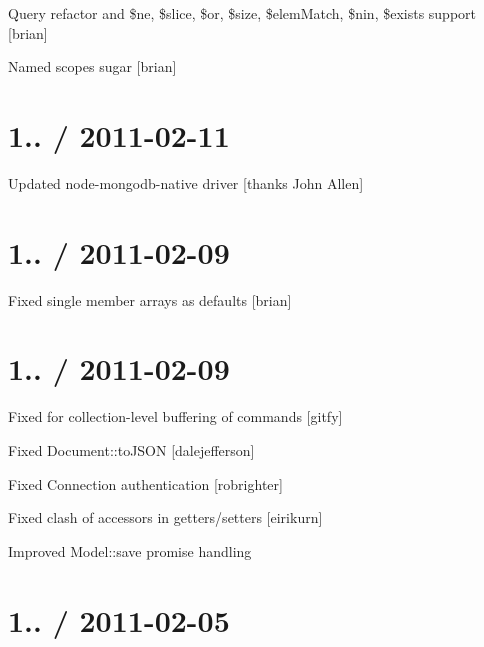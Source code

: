 \begin{DoxyItemize}
\item Query refactor and \$ne, \$slice, \$or, \$size, \$elem\+Match, \$nin, \$exists support \mbox{[}brian\mbox{]}
\item Named scopes sugar \mbox{[}brian\mbox{]}
\end{DoxyItemize}

\section*{1.. / 2011-\/02-\/11 }


\begin{DoxyItemize}
\item Updated node-\/mongodb-\/native driver \mbox{[}thanks John Allen\mbox{]}
\end{DoxyItemize}

\section*{1.. / 2011-\/02-\/09 }


\begin{DoxyItemize}
\item Fixed single member arrays as defaults \mbox{[}brian\mbox{]}
\end{DoxyItemize}

\section*{1.. / 2011-\/02-\/09 }


\begin{DoxyItemize}
\item Fixed for collection-\/level buffering of commands \mbox{[}gitfy\mbox{]}
\item Fixed {\ttfamily Document\+::to\+J\+S\+ON} \mbox{[}dalejefferson\mbox{]}
\item Fixed {\ttfamily Connection} authentication \mbox{[}robrighter\mbox{]}
\item Fixed clash of accessors in getters/setters \mbox{[}eirikurn\mbox{]}
\item Improved {\ttfamily Model\+::save} promise handling
\end{DoxyItemize}

\section*{1.. / 2011-\/02-\/05 }


